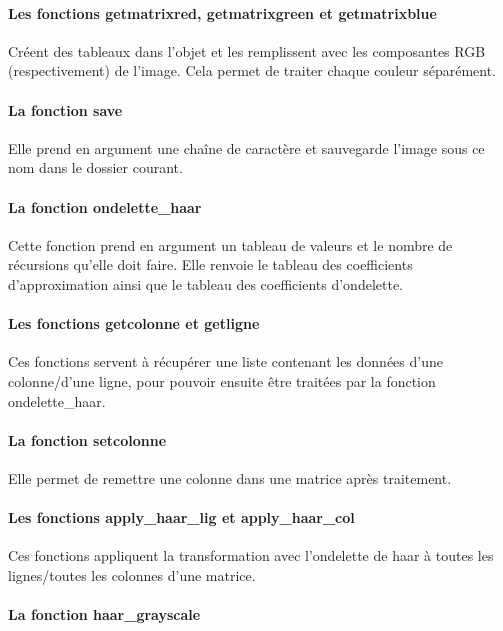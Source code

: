 \documentclass{article}
\begin{document}
\paragraph{Les fonctions getmatrixred, getmatrixgreen et getmatrixblue}

Créent des tableaux dans l'objet et les remplissent avec les composantes RGB (respectivement) de l'image. Cela permet de traiter chaque couleur séparément.

\paragraph{La fonction save}

Elle prend en argument une chaîne de caractère et sauvegarde l'image sous ce nom dans le dossier courant.

\paragraph{La fonction ondelette\_{}haar}

Cette fonction prend en argument un tableau de valeurs et le nombre de récursions qu'elle doit faire. Elle renvoie le tableau des coefficients d'approximation ainsi que le tableau des coefficients d'ondelette.

\paragraph{Les fonctions getcolonne et getligne}

Ces fonctions servent à récupérer une liste contenant les données d'une colonne/d'une ligne, pour pouvoir ensuite être traitées par la fonction ondelette\_{}haar.


\paragraph{La fonction setcolonne}

Elle permet de remettre une colonne dans une matrice après traitement.

\paragraph{Les fonctions apply\_{}haar\_{}lig et apply\_{}haar\_{}col}

Ces fonctions appliquent la transformation avec l'ondelette de haar à toutes les lignes/toutes les colonnes d'une matrice.

\paragraph{La fonction haar\_{}grayscale}
\end{document}
